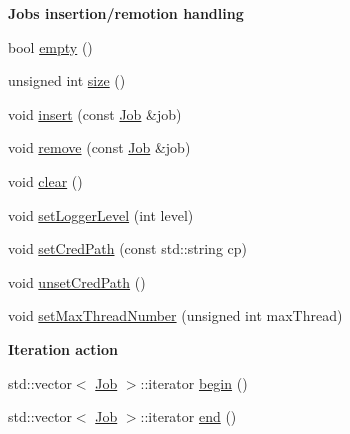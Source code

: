 \begin{Indent}{\bf Jobs insertion/remotion handling}\par
\begin{CompactItemize}
\item 
bool \hyperlink{classglite_1_1wmsui_1_1api_1_1JobCollection_z3_0}{empty} ()
\item 
unsigned int \hyperlink{classglite_1_1wmsui_1_1api_1_1JobCollection_z3_1}{size} ()
\item 
void \hyperlink{classglite_1_1wmsui_1_1api_1_1JobCollection_z3_2}{insert} (const \hyperlink{classglite_1_1wmsui_1_1api_1_1Job}{Job} \&job)
\item 
void \hyperlink{classglite_1_1wmsui_1_1api_1_1JobCollection_z3_3}{remove} (const \hyperlink{classglite_1_1wmsui_1_1api_1_1Job}{Job} \&job)
\item 
void \hyperlink{classglite_1_1wmsui_1_1api_1_1JobCollection_z3_4}{clear} ()
\item 
void \hyperlink{classglite_1_1wmsui_1_1api_1_1JobCollection_z3_5}{set\-Logger\-Level} (int level)
\item 
void \hyperlink{classglite_1_1wmsui_1_1api_1_1JobCollection_z3_6}{set\-Cred\-Path} (const std::string cp)
\item 
void \hyperlink{classglite_1_1wmsui_1_1api_1_1JobCollection_z3_7}{unset\-Cred\-Path} ()
\item 
void \hyperlink{classglite_1_1wmsui_1_1api_1_1JobCollection_z3_8}{set\-Max\-Thread\-Number} (unsigned int max\-Thread)
\end{CompactItemize}
\end{Indent}
\begin{Indent}{\bf Iteration action}\par
\begin{CompactItemize}
\item 
std::vector$<$ \hyperlink{classglite_1_1wmsui_1_1api_1_1Job}{Job} $>$::iterator \hyperlink{classglite_1_1wmsui_1_1api_1_1JobCollection_z5_0}{begin} ()
\item 
std::vector$<$ \hyperlink{classglite_1_1wmsui_1_1api_1_1Job}{Job} $>$::iterator \hyperlink{classglite_1_1wmsui_1_1api_1_1JobCollection_z5_1}{end} ()
\end{CompactItemize}
\end{Indent}
